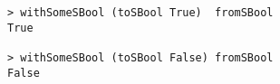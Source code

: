 \begin{repl}\begin{lstlisting}
> withSomeSBool (toSBool True)  fromSBool
True

> withSomeSBool (toSBool False) fromSBool
False\end{lstlisting}\end{repl}
